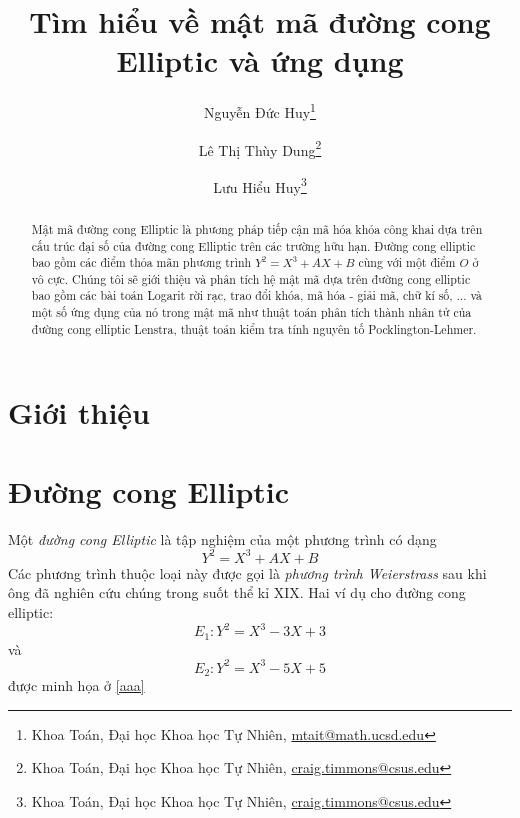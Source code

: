 \documentclass[12pt]{article}
\title{Tìm hiểu về mật mã đường cong Elliptic và ứng dụng}
\author{
    Nguyễn Đức Huy\thanks{Khoa Toán, Đại học Khoa học Tự Nhiên, \url{mtait@math.ucsd.edu}}
    \and
    Lê Thị Thùy Dung\thanks{Khoa Toán, Đại học Khoa học Tự Nhiên, \mbox{\url{craig.timmons@csus.edu}}}
    \and
    Lưu Hiểu Huy\thanks{Khoa Toán, Đại học Khoa học Tự Nhiên, \mbox{\url{craig.timmons@csus.edu}}}
}
\date{}
\begin{document}
\maketitle
\tableofcontents
\begin{abstract}
    Mật mã đường cong Elliptic là phương pháp tiếp cận mã hóa khóa công khai dựa trên cấu trúc đại số của đường cong Elliptic trên các trường hữu hạn.
    Đường cong elliptic bao gồm các điểm thỏa mãn phương trình $Y^2=X^3+AX+B$ cùng với một điểm $O$ ở vô cực. Chúng tôi sẽ giới thiệu và phân tích hệ mật mã
    dựa trên đường cong elliptic bao gồm các bài toán Logarit rời rạc, trao đổi khóa, mã hóa - giải mã, chữ kí số, ... và một số ứng dụng của nó trong mật mã
    như thuật toán phân tích thành nhân tử của đường cong elliptic Lenstra, thuật toán kiểm tra tính nguyên tố Pocklington-Lehmer.
\end{abstract}

\section{Giới thiệu}

\section{Đường cong Elliptic}
Một \textit{đường cong Elliptic} là tập nghiệm của một phương trình có dạng
$$Y^2 = X^3 + AX + B$$
Các phương trình thuộc loại này được gọi là \textit{phương trình Weierstrass} sau khi ông đã nghiên cứu chúng trong suốt thể kỉ XIX. Hai ví dụ cho đường cong elliptic:
$$ E_1: Y^2=X^3-3X+3 $$ và $$ E_2: Y^2=X^3-5X+5 $$ được minh họa ở \ref*{aaa}
\end{document}
